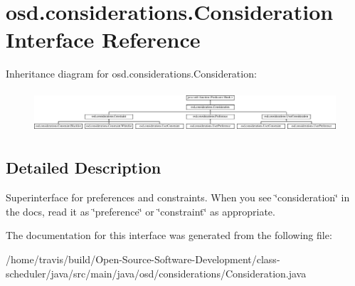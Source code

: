 \hypertarget{interfaceosd_1_1considerations_1_1_consideration}{\section{osd.\-considerations.\-Consideration Interface Reference}
\label{interfaceosd_1_1considerations_1_1_consideration}
}
Inheritance diagram for osd.\-considerations.\-Consideration\-:\begin{figure}[H]
\begin{center}
\leavevmode
\includegraphics[height=1.575246cm]{interfaceosd_1_1considerations_1_1_consideration}
\end{center}
\end{figure}


\subsection{Detailed Description}
Superinterface for preferences and constraints. When you see \char`\"{}consideration\char`\"{} in the docs, read it as \char`\"{}preference\char`\"{} or \char`\"{}constraint\char`\"{} as appropriate. 

The documentation for this interface was generated from the following file\-:\begin{DoxyCompactItemize}
\item 
/home/travis/build/\-Open-\/\-Source-\/\-Software-\/\-Development/class-\/scheduler/java/src/main/java/osd/considerations/Consideration.\-java\end{DoxyCompactItemize}
